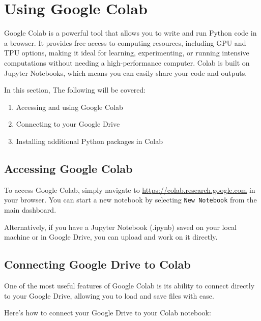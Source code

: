 \documentclass[
  letterpaper,
  DIV=11,
  numbers=noendperiod]{scrreprt}
\providecommand{\tightlist}{%
  \setlength{\itemsep}{0pt}\setlength{\parskip}{0pt}}\usepackage{longtable,booktabs,array}
\begin{document}
\hypertarget{using-google-colab}{%
\section{Using Google Colab}\label{using-google-colab}}

Google Colab is a powerful tool that allows you to write and run Python
code in a browser. It provides free access to computing resources,
including GPU and TPU options, making it ideal for learning,
experimenting, or running intensive computations without needing a
high-performance computer. Colab is built on Jupyter Notebooks, which
means you can easily share your code and outputs.

In this section, The following will be covered:

\begin{enumerate}
\def\labelenumi{\arabic{enumi}.}
\tightlist
\item
  Accessing and using Google Colab
\item
  Connecting to your Google Drive
\item
  Installing additional Python packages in Colab
\end{enumerate}

\hypertarget{accessing-google-colab}{%
\subsection{Accessing Google Colab}\label{accessing-google-colab}}

To access Google Colab, simply navigate to
\url{https://colab.research.google.com} in your browser. You can start a
new notebook by selecting \texttt{New\ Notebook} from the main
dashboard.

Alternatively, if you have a Jupyter Notebook (.ipynb) saved on your
local machine or in Google Drive, you can upload and work on it
directly.

\hypertarget{connecting-google-drive-to-colab}{%
\subsection{Connecting Google Drive to
Colab}\label{connecting-google-drive-to-colab}}

One of the most useful features of Google Colab is its ability to
connect directly to your Google Drive, allowing you to load and save
files with ease.

Here's how to connect your Google Drive to your Colab notebook:
\end{document}
